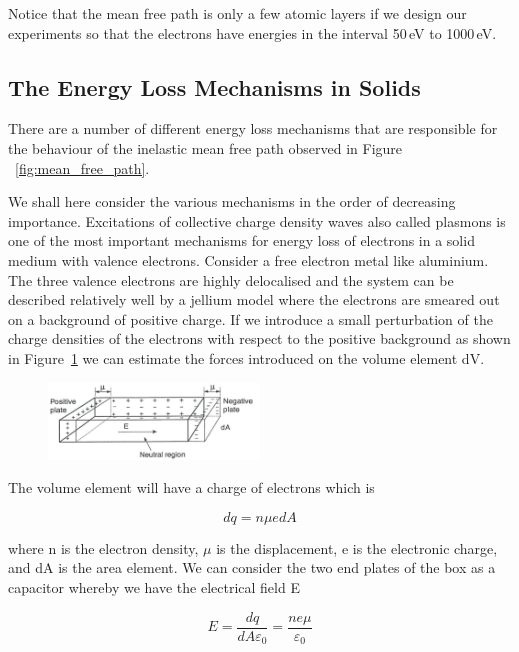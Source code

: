 Notice that the mean free path is only a few atomic layers if we design our experiments so that the electrons have energies in the interval 50\,eV to 1000\,eV.

\subsection{The Energy Loss Mechanisms in Solids}
There are a number of different energy loss mechanisms that are responsible for the behaviour of the inelastic mean free path observed in Figure ~\ref{fig:mean_free_path}.

We shall here consider the various mechanisms in the order of decreasing importance. Excitations of collective charge density waves also called plasmons is one of the most important mechanisms for energy loss of electrons in a solid medium with valence electrons. Consider a free electron metal like aluminium. The three valence electrons are highly delocalised and the system can be described relatively well by a jellium model where the electrons are smeared out on a background of positive charge. If we introduce a small perturbation of the charge densities of the electrons with respect to the positive background as shown in Figure~\ref{fig:plasmon_derive} we can estimate the forces introduced on the volume element dV.

\begin{figure}[htbp]
\centering
\includegraphics[width=0.5\textwidth]{figures/02_07}
\caption{ }
\label{fig:plasmon_derive}
\end{figure}
 
The volume element will have a charge of electrons which is

\begin{equation}
dq = n\mu edA
\end{equation}

where n is the electron density, $\mu$ is the displacement, e is the electronic charge, and dA is the area element. We can consider the two end plates of the box as a capacitor whereby we have the electrical field E

\begin{equation}
E = \frac{dq}{dA\varepsilon_{0}}=\frac{ne\mu}{\varepsilon_{0}}
\end{equation}


